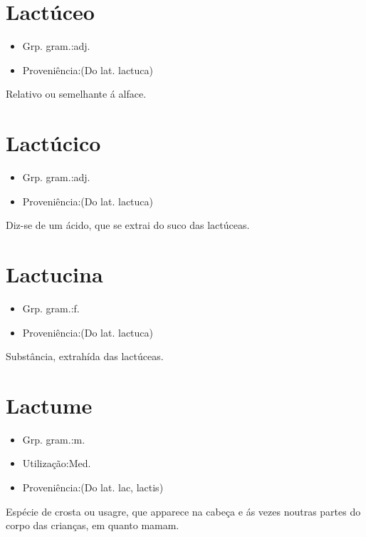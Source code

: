 \section{Lactúceo}
\begin{itemize}
\item {Grp. gram.:adj.}
\end{itemize}
\begin{itemize}
\item {Proveniência:(Do lat. \textunderscore lactuca\textunderscore )}
\end{itemize}
Relativo ou semelhante á alface.
\section{Lactúcico}
\begin{itemize}
\item {Grp. gram.:adj.}
\end{itemize}
\begin{itemize}
\item {Proveniência:(Do lat. \textunderscore lactuca\textunderscore )}
\end{itemize}
Diz-se de um ácido, que se extrai do suco das lactúceas.
\section{Lactucina}
\begin{itemize}
\item {Grp. gram.:f.}
\end{itemize}
\begin{itemize}
\item {Proveniência:(Do lat. \textunderscore lactuca\textunderscore )}
\end{itemize}
Substância, extrahída das lactúceas.
\section{Lactume}
\begin{itemize}
\item {Grp. gram.:m.}
\end{itemize}
\begin{itemize}
\item {Utilização:Med.}
\end{itemize}
\begin{itemize}
\item {Proveniência:(Do lat. \textunderscore lac\textunderscore , \textunderscore lactis\textunderscore )}
\end{itemize}
Espécie de crosta ou usagre, que apparece na cabeça e ás vezes noutras partes do corpo das crianças, em quanto mamam.
